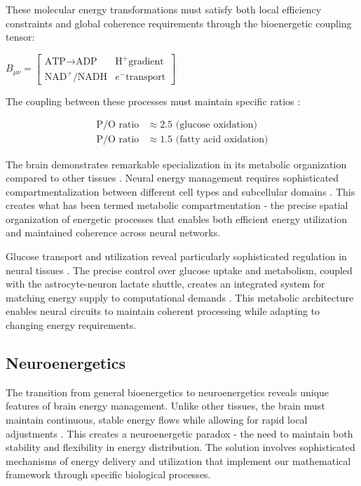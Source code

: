 \begin{refsection}
These molecular energy transformations must satisfy both local efficiency constraints and global coherence requirements through the bioenergetic coupling tensor:

$B_{\mu\nu} = \begin{bmatrix} 
\text{ATP}\rightarrow\text{ADP} & \text{H}^+\text{gradient} \\
\text{NAD}^+\text{/NADH} & e^-\text{transport}
\end{bmatrix}$

The coupling between these processes must maintain specific ratios \cite{Rolfe1997}:

\begin{align}
\text{P/O ratio} &\approx 2.5 \text{ (glucose oxidation)} \\
\text{P/O ratio} &\approx 1.5 \text{ (fatty acid oxidation)}
\end{align}

The brain demonstrates remarkable specialization in its metabolic organization compared to other tissues \cite{Berndt2012}. Neural energy management requires sophisticated compartmentalization between different cell types and subcellular domains \cite{Shulman2004}. This creates what has been termed metabolic compartmentation - the precise spatial organization of energetic processes that enables both efficient energy utilization and maintained coherence across neural networks.

Glucose transport and utilization reveal particularly sophisticated regulation in neural tissues \cite{Szablewski2017}. The precise control over glucose uptake and metabolism, coupled with the astrocyte-neuron lactate shuttle, creates an integrated system for matching energy supply to computational demands \cite{Pellerin2012}. This metabolic architecture enables neural circuits to maintain coherent processing while adapting to changing energy requirements.

\subsection{Neuroenergetics}

The transition from general bioenergetics to neuroenergetics reveals unique features of brain energy management. Unlike other tissues, the brain must maintain continuous, stable energy flows while allowing for rapid local adjustments \cite{DiNuzzo2017}. This creates a neuroenergetic paradox - the need to maintain both stability and flexibility in energy distribution. The solution involves sophisticated mechanisms of energy delivery and utilization that implement our mathematical framework through specific biological processes.


\end{refsection}
